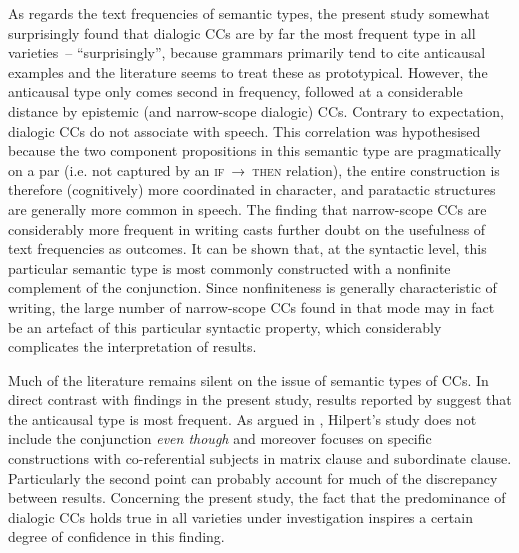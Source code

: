 As regards the text frequencies of semantic types, the present study somewhat surprisingly found that dialogic CCs are by far the most frequent type in all varieties~– “surprisingly”, because grammars primarily tend to cite anticausal examples and the literature seems to treat these as prototypical. However, the anticausal type only comes second in frequency, followed at a considerable distance by epistemic (and narrow-scope dialogic) CCs. Contrary to expectation, dialogic CCs do not associate with speech. This correlation was hypothesised because the two component propositions in this semantic type are pragmatically on a par (i.e. not captured by an \textsc{if~→~then} relation), the entire construction is therefore (cognitively) more coordinated in character, and paratactic structures are generally more common in speech. The finding that narrow-scope CCs are considerably more frequent in writing casts further doubt on the usefulness of text frequencies as outcomes. It can be shown that, at the syntactic level, this particular semantic type is most commonly constructed with a nonfinite complement of the conjunction. Since nonfiniteness is generally characteristic of writing, the large number of narrow-scope CCs found in that mode may in fact be an artefact of this particular syntactic property, which considerably complicates the interpretation of results.

Much of the literature remains silent on the issue of semantic types of CCs. In direct contrast with findings in the present study, results reported by \citet{Hilpert2013a} suggest that the anticausal type is most frequent. As argued in , Hilpert’s study does not include the conjunction \textit{even though} and moreover focuses on specific constructions with co-referential subjects in matrix clause and subordinate clause. Particularly the second point can probably account for much of the discrepancy between results. Concerning the present study, the fact that the predominance of dialogic CCs holds true in all varieties under investigation inspires a certain degree of confidence in this finding.\label{bkm:Ref80357452}\label{bkm:Ref80604785}

